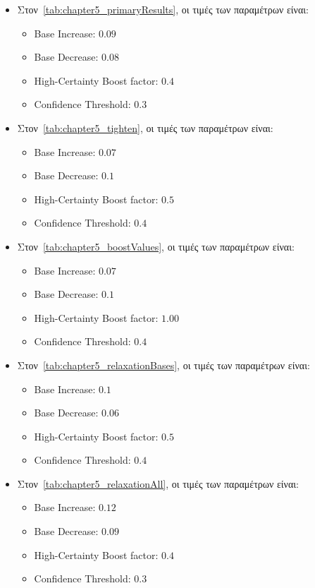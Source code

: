 \begin{itemize}
    \item Στον~\autoref{tab:chapter5_primaryResults}, οι τιμές των παραμέτρων είναι:
    \begin{itemize}
        \item Base Increase: $0.09$
        \item Base Decrease: $0.08$
        \item High-Certainty Boost factor: $0.4$
        \item Confidence Threshold: $0.3$
    \end{itemize}

    \item Στον~\autoref{tab:chapter5_tighten}, οι τιμές των παραμέτρων είναι:
    \begin{itemize}
        \item Base Increase: $0.07$
        \item Base Decrease: $0.1$
        \item High-Certainty Boost factor: $0.5$
        \item Confidence Threshold: $0.4$
    \end{itemize}

    \item Στον~\autoref{tab:chapter5_boostValues}, οι τιμές των παραμέτρων είναι:
    \begin{itemize}
        \item Base Increase: $0.07$
        \item Base Decrease: $0.1$
        \item High-Certainty Boost factor: $1.00$
        \item Confidence Threshold: $0.4$
    \end{itemize}

     \item Στον~\autoref{tab:chapter5_relaxationBases}, οι τιμές των παραμέτρων είναι:
    \begin{itemize}
        \item Base Increase: $0.1$
        \item Base Decrease: $0.06$
        \item High-Certainty Boost factor: $0.5$
        \item Confidence Threshold: $0.4$
    \end{itemize}

     \item Στον~\autoref{tab:chapter5_relaxationAll}, οι τιμές των παραμέτρων είναι:
    \begin{itemize}
        \item Base Increase: $0.12$
        \item Base Decrease: $0.09$
        \item High-Certainty Boost factor: $0.4$
        \item Confidence Threshold: $0.3$
    \end{itemize}
\end{itemize}

